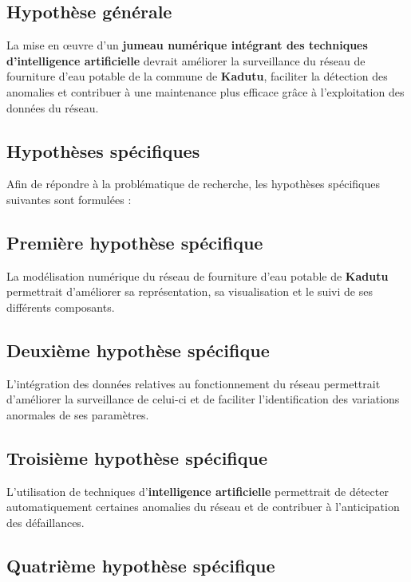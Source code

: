 \subsection{Hypothèse générale}
\label{hypothese-generale}

La mise en œuvre d'un \textbf{jumeau numérique intégrant des techniques
	d'intelligence artificielle} devrait améliorer la surveillance du
réseau de fourniture d'eau potable de la commune de \textbf{Kadutu},
faciliter la détection des anomalies et contribuer à une maintenance
plus efficace grâce à l'exploitation des données du réseau.

\subsection{Hypothèses spécifiques}
\label{hypotheses-specifiques}

Afin de répondre à la problématique de recherche, les hypothèses
spécifiques suivantes sont formulées :

\subsection{Première hypothèse spécifique}
\label{premiere-hypothese-specifique}

La modélisation numérique du réseau de fourniture d'eau potable de
\textbf{Kadutu} permettrait d'améliorer sa représentation, sa
visualisation et le suivi de ses différents composants.

\subsection{Deuxième hypothèse spécifique}
\label{deuxieme-hypothese-specifique}

L'intégration des données relatives au fonctionnement du réseau
permettrait d'améliorer la surveillance de celui-ci et de faciliter
l'identification des variations anormales de ses paramètres.

\subsection{Troisième hypothèse spécifique}
\label{troisieme-hypothese-specifique}

L'utilisation de techniques d'\textbf{intelligence artificielle}
permettrait de détecter automatiquement certaines anomalies du réseau
et de contribuer à l'anticipation des défaillances.

\subsection{Quatrième hypothèse spécifique}
\label{quatrieme-hypothese-specifique}

